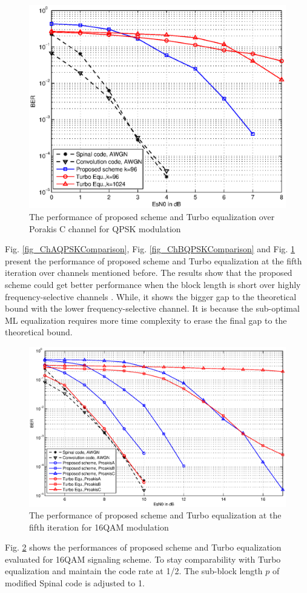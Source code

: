 \documentclass[conference]{IEEEtran}
\begin{document}
\begin{figure}[!t]
\centering
\includegraphics[width=3.1 in]{ChCQPSKComparison.eps}
\caption{The performance of proposed scheme and Turbo equalization over Porakis C channel for QPSK modulation}
\label{fig_ChCQPSKComparison}
\end{figure}
Fig. \ref{fig_ChAQPSKComparison}, Fig. \ref{fig_ChBQPSKComparison} and Fig. \ref{fig_ChCQPSKComparison}  present the performance of proposed scheme and Turbo equalization at the fifth iteration over channels mentioned before.  The results show that the proposed scheme could get better performance when the block length is short over highly frequency-selective channels . While, it shows the bigger gap to the theoretical bound with the lower frequency-selective channel. It is because the sub-optimal ML equalization requires more time complexity to erase the final gap to the theoretical bound.
\begin{figure}[!t]
\centering
\includegraphics[width=3.5 in]{16QAMComparison.eps}
\caption{The performance of proposed scheme and Turbo equalization at the fifth iteration for 16QAM modulation}
\label{fig_16QAMComparison}
\end{figure}

Fig. \ref{fig_16QAMComparison} shows the performances of proposed scheme and Turbo equalization evaluated for 16QAM signaling scheme. To stay comparability with Turbo equalization and maintain the code rate at 1/2. The sub-block length $p$ of modified Spinal code is adjusted to 1. 
\end{document}
